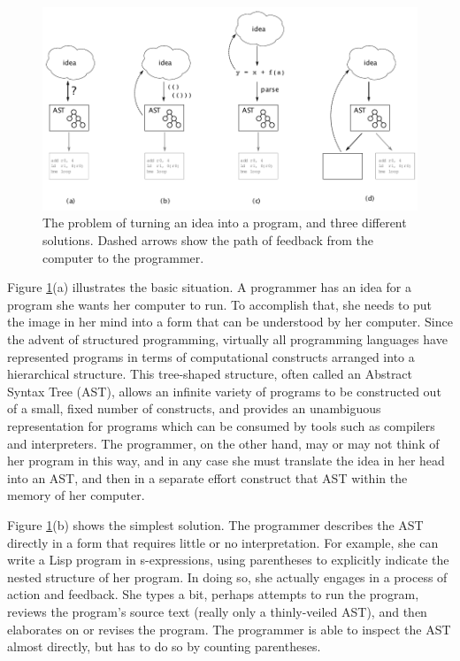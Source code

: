 \begin{figure}[h]
  \begin{center}
  
  \includegraphics{src/image/figure1.pdf}
  \end{center}
  \caption{The problem of turning an idea into a program, and three different solutions. Dashed arrows show the path of feedback from the computer to the programmer.}
  \label{fig-1}
\end{figure}

Figure \ref{fig-1}(a) illustrates the basic situation. A programmer has an idea for a program she wants her computer to run. To accomplish that, she needs to put the image in her mind into a form that can be understood by her computer. Since the advent of structured programming, virtually all programming languages have represented programs in terms of computational constructs arranged into a hierarchical structure. This tree-shaped structure, often called an Abstract Syntax Tree (AST), allows an infinite variety of programs to be constructed out of a small, fixed number of constructs, and provides an unambiguous representation for programs which can be consumed by tools such as compilers and interpreters. The programmer, on the other hand, may or may not think of her program in this way, and in any case she must translate the idea in her head into an AST, and then in a separate effort construct that AST within the memory of her computer.

Figure \ref{fig-1}(b) shows the simplest solution. The programmer describes the AST directly in a form that requires little or no interpretation. For example, she can write a Lisp program in s-expressions, using parentheses to explicitly indicate the nested structure of her program. In doing so, she actually engages in a process of action and feedback. She types a bit, perhaps attempts to run the program, reviews the program's source text (really only a thinly-veiled AST), and then elaborates on or revises the program. The programmer is able to inspect the AST almost directly, but has to do so by counting parentheses.

